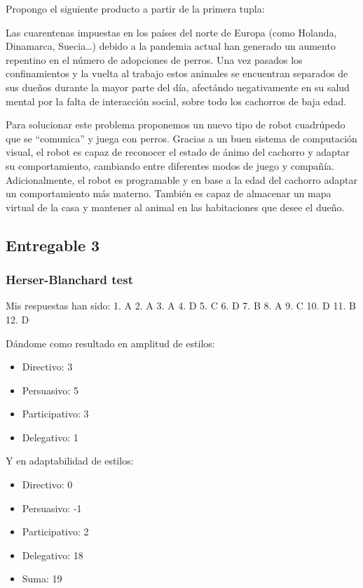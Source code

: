 \vspace{\baselineskip}

Propongo el siguiente producto a partir de la primera tupla:

Las cuarentenas impuestas en los países del norte de Europa (como Holanda, Dinamarca, Suecia\dots) debido a la pandemia actual han generado un aumento repentino en el número de adopciones de perros. 
Una vez pasados los confinamientos y la vuelta al trabajo estos animales se encuentran separados de sus dueños durante la mayor parte del día, afectándo negativamente en su salud mental por la falta de interacción social, sobre todo los cachorros de baja edad.

Para solucionar este problema proponemos un nuevo tipo de robot cuadrúpedo que se ``comunica'' y juega con perros. Gracias a un buen sistema de computación visual, el robot es capaz de reconocer el estado de ánimo del cachorro y adaptar su comportamiento, cambiando entre diferentes modos de juego y compañía. Adicionalmente, el robot es programable y en base a la edad del cachorro adaptar un comportamiento más materno. También es capaz de almacenar un mapa virtual de la casa y mantener al animal en las habitaciones que desee el dueño.


\subsection{Entregable 3}

\subsubsection{Herser-Blanchard test}

Mis respuestas han sido: 1. A 2. A 3. A 4. D 5. C 6. D 7. B 8. A 9. C 10. D 11. B 12. D

Dándome como resultado en amplitud de estilos:
\begin{itemize}
    \item Directivo: 3
    \item Persuasivo: 5
    \item Participativo: 3
    \item Delegativo: 1
\end{itemize}

Y en adaptabilidad de estilos:
\begin{itemize}
    \item Directivo: 0
    \item Persuasivo: -1
    \item Participativo: 2
    \item Delegativo: 18
    \item Suma: 19
\end{itemize}

